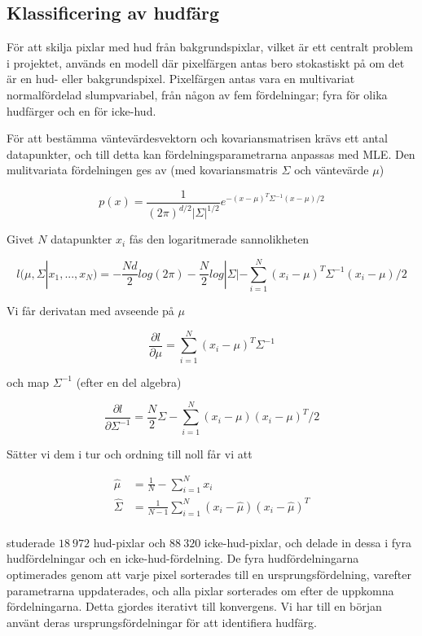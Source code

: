 \documentclass[../rapport_MVEX01-11-05]{subfiles}
\begin{document}
\subsection{Klassificering av hudfärg}

För att skilja pixlar med hud från bakgrundspixlar, vilket är ett
centralt problem i projektet, används en modell där pixelfärgen antas
bero stokastiskt på om det är en hud- eller
bakgrundspixel. Pixelfärgen antas vara en multivariat normalfördelad
slumpvariabel, från någon av fem fördelningar; fyra för olika
hudfärger och en för icke-hud.

För att bestämma väntevärdesvektorn och kovariansmatrisen krävs ett
 antal datapunkter, och till detta kan fördelningsparametrarna
 anpassas med MLE. Den mulitvariata fördelningen ges av (med kovariansmatris
 $\Sigma$ och väntevärde $\mu$)

\begin{equation}
p(x)=\frac{1}{(2\pi)^{d/2}|\Sigma|^{1/2}}e^{-(x-\mu)^T\Sigma^{-1}(x-\mu)/2}
\end{equation}

Givet $N$ datapunkter $x_i$ fås den logaritmerade sannolikheten

\begin{equation}
l(\mu,\Sigma|x_1,...,x_N)=-\frac{Nd}{2}log(2\pi)-\frac{N}{2}log|\Sigma|-\sum_{i=1}^N(x_i-\mu)^T\Sigma^{-1}(x_i-\mu)/2
\end{equation}

Vi får derivatan med avseende på $\mu$

\begin{equation}
\frac{\partial l}{\partial \mu}=\sum_{i=1}^N(x_i-\mu)^T\Sigma^{-1}
\end{equation}

och map $\Sigma^{-1}$ (efter en del algebra)

\begin{equation}
\frac{\partial l}{\partial \Sigma^{-1}}=\frac{N}{2}\Sigma -\sum_{i=1}^N(x_i-\mu)(x_i-\mu)^T/2
\end{equation}

Sätter vi dem i tur och ordning till noll får vi att

\begin{align}
\hat\mu&=\frac{1}{N}-\sum_{i=1}^Nx_i\\
\hat\Sigma&=\frac{1}{N-1}\sum_{i=1}^N(x_i-\hat\mu)(x_i-\hat\mu)^T\\
\end{align}

 studerade $18\:972$
hud-pixlar och $88\:320$ icke-hud-pixlar, och delade in dessa i fyra
hudfördelningar och en icke-hud-fördelning. De fyra hudfördelningarna
optimerades genom att varje pixel sorterades till en
ursprungsfördelning, varefter parametrarna uppdaterades, och alla
pixlar sorterades om efter de uppkomna fördelningarna. Detta gjordes
iterativt till konvergens. Vi har till en början använt deras
ursprungsfördelningar för att identifiera hudfärg.

\end{document}
